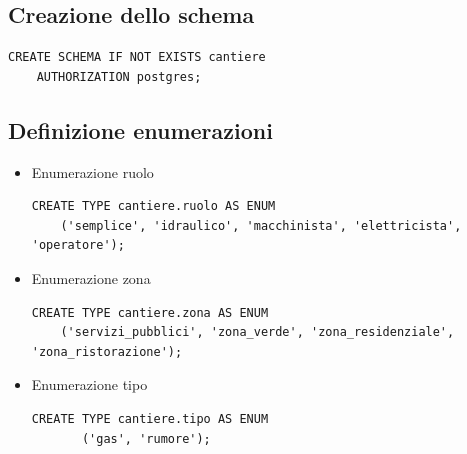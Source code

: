 \documentclass[11pt]{article}
\begin{document}
\subsection*{Creazione dello schema}
\label{sec:org8fc7f62}
\begin{verbatim}
CREATE SCHEMA IF NOT EXISTS cantiere
    AUTHORIZATION postgres;
\end{verbatim}
\subsection*{Definizione enumerazioni}
\label{sec:org9c1326a}
\begin{itemize}
\item Enumerazione ruolo
\label{sec:org71a97f5}
\begin{verbatim}
CREATE TYPE cantiere.ruolo AS ENUM
    ('semplice', 'idraulico', 'macchinista', 'elettricista', 'operatore');
\end{verbatim}
\item Enumerazione zona
\label{sec:org00396a0}
\begin{verbatim}
CREATE TYPE cantiere.zona AS ENUM
    ('servizi_pubblici', 'zona_verde', 'zona_residenziale', 'zona_ristorazione');
\end{verbatim}
\item Enumerazione tipo
\label{sec:orgae25546}
\begin{verbatim}
CREATE TYPE cantiere.tipo AS ENUM
       ('gas', 'rumore');
\end{verbatim}
\end{itemize}
\end{document}
